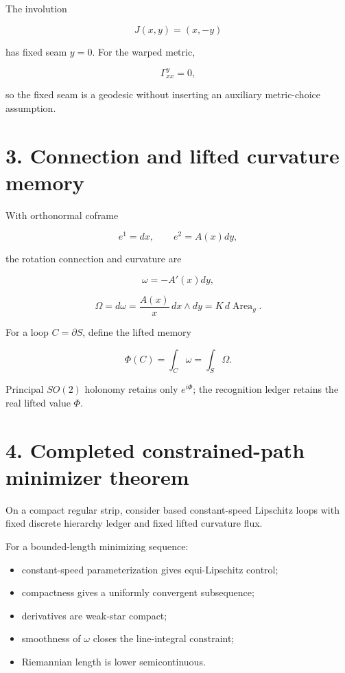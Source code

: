 The involution

\[
J(x,y)=(x,-y)
\]

has fixed seam \(y=0\). For the warped metric,

\[
\Gamma^y_{xx}=0,
\]

so the fixed seam is a geodesic without inserting an auxiliary metric-choice assumption.

\hypertarget{connection-and-lifted-curvature-memory}{%
\section{3. Connection and lifted curvature memory}\label{connection-and-lifted-curvature-memory}}

With orthonormal coframe

\[
e^1=dx,
\qquad
e^2=A(x)dy,
\]

the rotation connection and curvature are

\[
\omega=-A'(x)dy,
\]

\[
\Omega=d\omega=\frac{A(x)}x\,dx\wedge dy=K\,d\operatorname{Area}_g.
\]

For a loop \(C=\partial S\), define the lifted memory

\[
\Phi(C)=\int_C\omega=\int_S\Omega.
\]

Principal \(SO(2)\) holonomy retains only \(e^{i\Phi}\); the recognition ledger retains the real lifted value \(\Phi\).

\hypertarget{completed-constrained-path-minimizer-theorem}{%
\section{4. Completed constrained-path minimizer theorem}\label{completed-constrained-path-minimizer-theorem}}

On a compact regular strip, consider based constant-speed Lipschitz loops with fixed discrete hierarchy ledger and fixed lifted curvature flux.

For a bounded-length minimizing sequence:

\begin{itemize}
\tightlist
\item
  constant-speed parameterization gives equi-Lipschitz control;
\item
  compactness gives a uniformly convergent subsequence;
\item
  derivatives are weak-star compact;
\item
  smoothness of \(\omega\) closes the line-integral constraint;
\item
  Riemannian length is lower semicontinuous.
\end{itemize}

